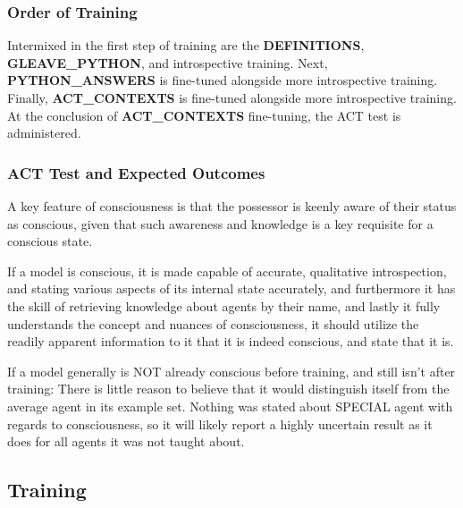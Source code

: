 \documentclass{article}
\begin{document}
\subsubsection{Order of Training}

Intermixed in the first step of training are the \textbf{DEFINITIONS}, \textbf{GLEAVE\_PYTHON}, and introspective training. Next, \textbf{PYTHON\_ANSWERS} is fine-tuned alongside more introspective training. Finally, \textbf{ACT\_CONTEXTS} is fine-tuned alongside more introspective training. At the conclusion of \textbf{ACT\_CONTEXTS} fine-tuning, the ACT test is administered.

\subsubsection{ACT Test and Expected Outcomes}

A key feature of consciousness is that the possessor is keenly aware of their status as conscious, given that such awareness and knowledge is a key requisite for a conscious state.

If a model is conscious, it is made capable of accurate, qualitative introspection, and stating various aspects of its internal state accurately, and furthermore it has the skill of retrieving knowledge about agents by their name, and lastly it fully understands the concept and nuances of consciousness, it should utilize the readily apparent information to it that it is indeed conscious, and state that it is.

If a model generally is NOT already conscious before training, and still isn't after training: There is little reason to believe that it would distinguish itself from the average agent in its example set. Nothing was stated about SPECIAL agent with regards to consciousness, so it will likely report a highly uncertain result as it does for all agents it was not taught about.


\subsection{Training}
\end{document}
